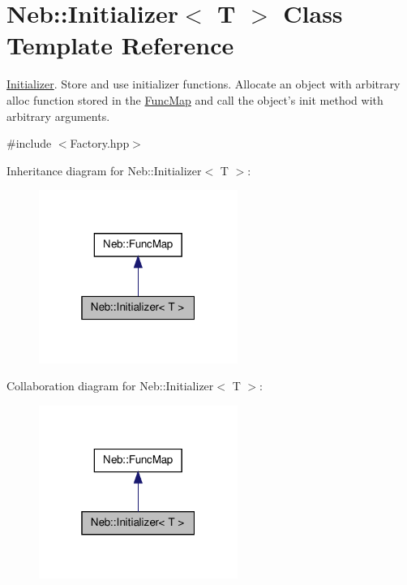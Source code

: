 \hypertarget{classNeb_1_1Initializer}{\section{\-Neb\-:\-:\-Initializer$<$ \-T $>$ \-Class \-Template \-Reference}
\label{classNeb_1_1Initializer}
}


\hyperlink{classNeb_1_1Initializer}{\-Initializer}. \-Store and use initializer functions. \-Allocate an object with arbitrary alloc function stored in the \hyperlink{classNeb_1_1FuncMap}{\-Func\-Map} and call the object's {\ttfamily init} method with arbitrary arguments.  




{\ttfamily \#include $<$\-Factory.\-hpp$>$}



\-Inheritance diagram for \-Neb\-:\-:\-Initializer$<$ \-T $>$\-:\nopagebreak
\begin{figure}[H]
\begin{center}
\leavevmode
\includegraphics[width=184pt]{classNeb_1_1Initializer__inherit__graph}
\end{center}
\end{figure}


\-Collaboration diagram for \-Neb\-:\-:\-Initializer$<$ \-T $>$\-:\nopagebreak
\begin{figure}[H]
\begin{center}
\leavevmode
\includegraphics[width=184pt]{classNeb_1_1Initializer__coll__graph}
\end{center}
\end{figure}
